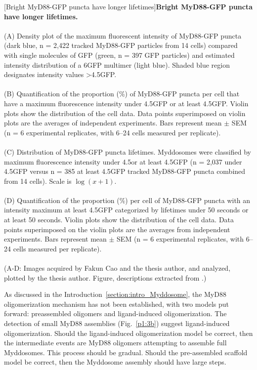 \begin{centering}
\captionsetup{parbox=none}
[Bright MyD88-GFP puncta have longer lifetimes]{\textbf{Bright MyD88-GFP puncta have longer lifetimes.}
\\
\\
(A) Density plot of the maximum fluorescent intensity of MyD88-GFP puncta (dark blue, n = 2,422 tracked MyD88-GFP particles from 14 cells) compared with single molecules of GFP (green, n = 397 GFP particles) and estimated intensity distribution of a 6\times GFP multimer (light blue). Shaded blue region designates intensity values >4.5\times GFP.
\\
\\
(B) Quantification of the proportion (\%) of MyD88-GFP puncta per cell that have a maximum fluorescence intensity under 4.5\times GFP or at least 4.5\times GFP. Violin plots show the distribution of the cell data. Data points superimposed on violin plots are the averages of independent experiments. Bars represent mean $\pm$ SEM (n = 6 experimental replicates, with 6--24 cells measured per replicate).
\\
\\
(C) Distribution of MyD88-GFP puncta lifetimes. Myddosomes were classified by maximum fluorescence intensity under 4.5\times or at least 4.5\times GFP (n = 2,037 under 4.5\times GFP versus n = 385 at least 4.5\times GFP tracked MyD88-GFP puncta combined from 14 cells). Scale is $\log(x+1)$.
\\
\\
(D) Quantification of the proportion (\%) per cell of MyD88-GFP puncta with an intensity maximum at least 4.5\times GFP categorized by lifetimes under 50 seconds or at least 50 seconds. Violin plots show the distribution of the cell data. Data points superimposed on the violin plots are the averages from independent experiments. Bars represent mean $\pm$ SEM (n = 6 experimental replicates, with 6--24 cells measured per replicate).
\\
\\
(A-D: Images acquired by Fakun Cao and the thesis author, and analyzed, plotted by the thesis author. Figure, descriptions extracted from \autocite{Deliz-Aguirre_2021}.)}
\label{p1:3b}
\end{centering}

As discussed in the Introduction~\ref{section:intro_Myddosome}, the MyD88 oligomerization mechanism has not been established, with two models put forward: preassembled oligomers and ligand-induced oligomerization. The detection of small MyD88 assemblies (Fig.~\ref{p1:3b}) suggest ligand-induced oligomerization. Should the ligand-induced oligomerization model be correct, then the intermediate events are MyD88 oligomers attempting to assemble full Myddosomes. This process should be gradual. Should the pre-assembled scaffold model be correct, then the Myddosome assembly should have large steps.

